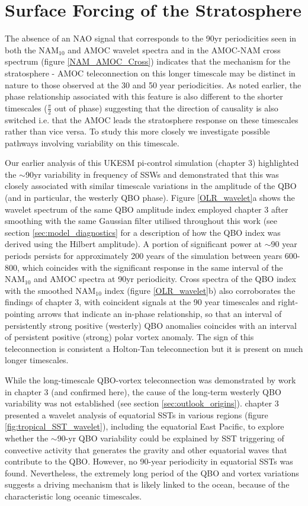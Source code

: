 \section{Surface Forcing of the Stratosphere}\label{surface-strat_forcing}
The absence of an NAO signal that corresponds to the 90yr periodicities seen in both the NAM$_{10}$ and AMOC wavelet spectra and in the  AMOC-NAM cross spectrum (figure \ref{NAM_AMOC_Cross}) indicates that the mechanism for the stratosphere - AMOC teleconnection on this longer timescale may be distinct in nature to those observed at the 30 and 50 year periodicities. As noted earlier, the phase relationship associated with this feature is also different to the shorter timescales ($\frac{\pi}{2}$ out of phase) suggesting that the direction of causality is also switched i.e. that the AMOC leads the stratosphere response on these timescales rather than vice versa. To study this more closely we investigate possible pathways involving variability on this timescale.

Our earlier analysis of this UKESM pi-control simulation (chapter 3) highlighted the $\sim$90yr variability in frequency of SSWs and demonstrated that this was closely associated with similar timescale variations in the amplitude of the QBO (and in particular, the westerly QBO phase). Figure \ref{OLR_wavelet}a shows the wavelet spectrum of the same QBO amplitude index employed chapter 3 after smoothing with the same Gaussian filter utilised throughout this work (see section \ref{sec:model_diagnostics} for a description of how the QBO index was derived using the Hilbert amplitude). A portion of significant power at $\sim$90 year periods persists for approximately 200 years of the simulation between years 600-800, which coincides with the significant response in the same interval of the NAM$_{10}$ and AMOC spectra at 90yr periodicity. Cross spectra of the QBO index with the smoothed NAM$_{10}$ index (figure \ref{OLR_wavelet}b) also corroborates the findings of chapter 3, with coincident signals at the 90 year timescales and right-pointing arrows that indicate an in-phase relationship, so that an interval of persistently strong positive (westerly) QBO anomalies coincides with an interval of persistent positive (strong) polar vortex anomaly. The sign of this teleconnection is consistent a Holton-Tan teleconnection \citep{luDecadalscale2008a, luMechanisms2014a} but it is present on much longer timescales. 

While the long-timescale QBO-vortex teleconnection was demonstrated by work in chapter 3 (and confirmed here), the cause of the long-term westerly QBO variability was not established (see section \ref{sec:outlook_origins}). chapter 3 presented a wavelet analysis of equatorial SSTs in various regions (figure \ref{fig:tropical_SST_wavelet}), including the equatorial East Pacific, to explore whether the $\sim$90-yr QBO variability could be explained by SST triggering of convective activity that generates the gravity and other equatorial waves that contribute to the QBO. However, no 90-year periodicity in equatorial SSTs was found. Nevertheless, the extremely long period of the QBO and vortex variations suggests a driving mechanism that is likely linked to the ocean, because of the characteristic long oceanic timescales.

